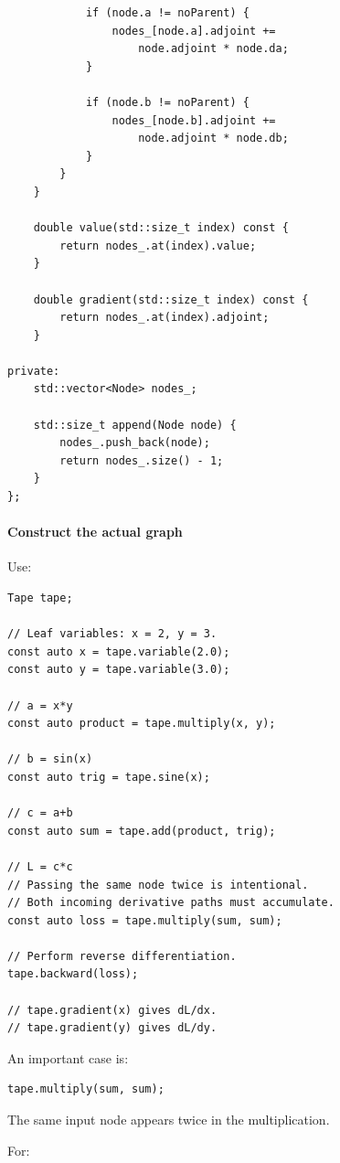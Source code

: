 \begin{verbatim}
            if (node.a != noParent) {
                nodes_[node.a].adjoint +=
                    node.adjoint * node.da;
            }

            if (node.b != noParent) {
                nodes_[node.b].adjoint +=
                    node.adjoint * node.db;
            }
        }
    }

    double value(std::size_t index) const {
        return nodes_.at(index).value;
    }

    double gradient(std::size_t index) const {
        return nodes_.at(index).adjoint;
    }

private:
    std::vector<Node> nodes_;

    std::size_t append(Node node) {
        nodes_.push_back(node);
        return nodes_.size() - 1;
    }
};
\end{verbatim}

\paragraph{Construct the actual graph}\label{02-foundations-ii-ch022-construct-the-actual-graph}

Use:

\begin{verbatim}
Tape tape;

// Leaf variables: x = 2, y = 3.
const auto x = tape.variable(2.0);
const auto y = tape.variable(3.0);

// a = x*y
const auto product = tape.multiply(x, y);

// b = sin(x)
const auto trig = tape.sine(x);

// c = a+b
const auto sum = tape.add(product, trig);

// L = c*c
// Passing the same node twice is intentional.
// Both incoming derivative paths must accumulate.
const auto loss = tape.multiply(sum, sum);

// Perform reverse differentiation.
tape.backward(loss);

// tape.gradient(x) gives dL/dx.
// tape.gradient(y) gives dL/dy.
\end{verbatim}

An important case is:

\begin{verbatim}
tape.multiply(sum, sum);
\end{verbatim}

The same input node appears twice in the multiplication.

For:

